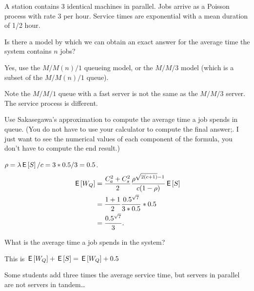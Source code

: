 A station contains 3 identical machines in parallel. Jobs arrive as a Poisson process with rate $3$ per hour. Service times are exponential with a mean duration of 1/2 hour. 

\begin{exercise}[201807]\label{ex:92}
  Is there a model by which we can obtain an exact answer for the average time the system contains $n$ jobs? 
\begin{solution}
    Yes, use the $M/M(n)/1$ queueing model, or the $M/M/3$ model (which is a subset of the $M/M(n)/1$ queue). 

Note the $M/M/1$ queue with a fast server is not the same as the $M/M/3$ server. The service process is different. 
\end{solution}
\end{exercise}


\begin{exercise}[201807]{1}
Use Sakasegawa's approximation to compute the average time a job spends in queue. (You do not have to use your calculator to compute the final answer;. I just want to see the numerical values of each component of the formula, you don't have to compute the end result.)
\begin{solution}
$\rho = \lambda \,\mathsf{E}\left[S\right]/c = 3 *0.5/3=0.5$.
\begin{align*}
  \,\mathsf{E}\left[W_Q\right] 
&= \frac{C_a^2+C_s^2}2 \frac{\rho^{\sqrt{2(c+1)}-1}}{c(1-\rho)} \,\mathsf{E}\left[S\right] \\
&= \frac{1+1}2 \frac{0.5^{\sqrt{7}}}{3*0.5} *0.5 \\
&=\frac{0.5^{\sqrt{7}}}{3}. 
\end{align*}
\end{solution}
\end{exercise}


\begin{exercise}[201807]{1}
  What is the average time a job spends in the system?
\begin{solution}
    This is $\,\mathsf{E}\left[W_Q\right] + \,\mathsf{E}\left[S\right] = \,\mathsf{E}\left[W_Q\right] + 0.5$
\end{solution}

Some students add three times the average service time, but servers in parallel are not servers in tandem\ldots
\end{exercise}



